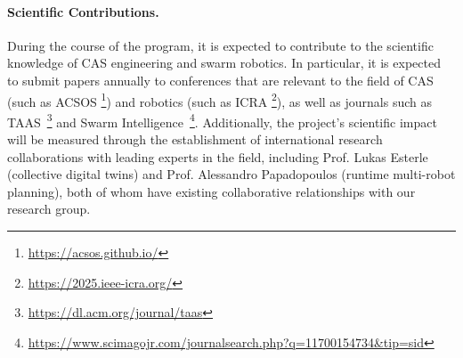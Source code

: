 \documentclass[12pt]{article}
\begin{document}
\paragraph{Scientific Contributions.}
During the course of the program, it is expected to contribute to the scientific knowledge of CAS engineering and swarm robotics. 
In particular, it is expected to submit papers annually to conferences that are relevant to the field of CAS (such as ACSOS \footnote{\url{https://acsos.github.io/}}) and robotics (such as ICRA \footnote{\url{https://2025.ieee-icra.org/}}),
as well as journals such as TAAS~\footnote{\url{https://dl.acm.org/journal/taas}} and Swarm Intelligence~\footnote{\url{https://www.scimagojr.com/journalsearch.php?q=11700154734&tip=sid}}.
Additionally, the project's scientific impact will be measured through the establishment of international research collaborations with leading experts in the field, including Prof. Lukas Esterle (collective digital twins) and Prof. Alessandro Papadopoulos (runtime multi-robot planning), both of whom have existing collaborative relationships with our research group.
\clearpage

\renewcommand{\refname}{References}



\end{document}
